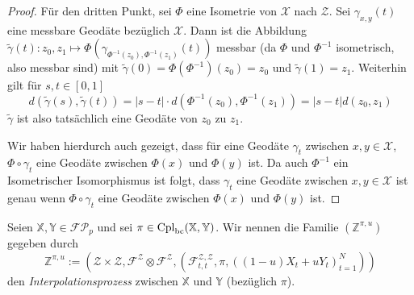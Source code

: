\begin{proof}
    Für den dritten Punkt, sei $\Phi$ eine Isometrie von $\mathcal{X}$ nach $\mathcal{Z}$. Sei $\gamma_{x,y}(t)$ eine messbare Geodäte bezüglich $\mathcal{X}$. Dann ist die Abbildung $\tilde{\gamma}(t): z_0, z_1 \mapsto \Phi(\gamma_{\Phi^{-1}(z_0), \Phi^{-1}(z_1)}(t))$ messbar (da $\Phi$ und $\Phi^{-1}$ isometrisch, also messbar sind) mit $\tilde{\gamma}(0) = \Phi(\Phi^{-1})(z_0)=z_0$ und $\tilde{\gamma}(1) = z_1$. Weiterhin gilt für $s,t\in[0,1]$
    $$d(\tilde{\gamma}(s), \tilde{\gamma}(t)) = |s-t|\cdot d\left(\Phi^{-1}(z_0), \Phi^{-1}(z_1)\right) = |s-t|d(z_0, z_1)$$
    $\tilde{\gamma}$ ist also tatsächlich eine Geodäte von $z_0$ zu $z_1$.

    Wir haben hierdurch auch gezeigt, dass für eine Geodäte $\gamma_t$ zwischen $x,y\in \mathcal{X}$, $\Phi \circ \gamma_t$ eine Geodäte zwischen $\Phi(x)$ und $\Phi(y)$ ist. Da auch $\Phi^{-1}$ ein Isometrischer Isomorphismus ist folgt, dass $\gamma_t$ eine Geodäte zwischen $x,y\in\mathcal{X}$ ist genau wenn $\Phi\circ \gamma_t$ eine Geodäte zwischen $\Phi(x)$ und $\Phi(y)$ ist.
\end{proof}
\begin{definition}[Interpolationsprozess]
    Seien $\mathbb{X,Y} \in \mathcal{FP}_p$ und sei $\pi \in \operatorname{Cpl}_{\operatorname{bc}}(\mathbb{X,Y})$. Wir nennen die Familie $(\mathbb{Z}^{\pi, u})$ gegeben durch
    $$\mathbb{Z}^{\pi, u} := \left(\mathcal{Z}\times \mathcal{Z}, \mathcal{F}^\mathcal{Z}\otimes \mathcal{F}^\mathcal{Z}, \left(\mathcal{F}_{t,t}^{\mathcal{Z},\mathcal{Z}}, \pi, \left((1-u)X_t + uY_t\right)_{t=1}^N \right) \right) $$
    den \emph{Interpolationsprozess} zwischen $\mathbb{X}$ und $\mathbb{Y}$ (bezüglich $\pi$).
\end{definition}

